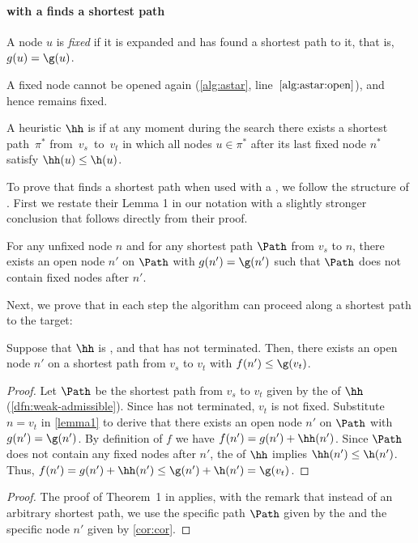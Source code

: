 \paragraph{\A with a \wah finds a shortest path}
\label{sec:weak-admissible-dfn}

\begin{definition}
  A node $u$ is \emph{fixed} if it is expanded and \A has found a shortest path
  to it, that is, $g(u) = \g(u)$.
\end{definition}
A fixed node cannot be opened again (\cref{alg:astar}, line~$\ref{alg:astar:open}$),
and hence remains fixed.

\begin{definition}[\Wa]\label{dfn:weak-admissible}%
  A heuristic $\hh$ is \emph{\wa} if at any moment during the \A search there
  exists a shortest path~$\pi^*$ from~$v_s$~to~$v_t$ in which all nodes $u
  \in \pi^*$ after its last fixed node $n^*$ satisfy $\hh(u) \leq \h(u)$.
\end{definition}

To prove that \A finds a shortest path when used with a \wah, we follow the
structure of \citet{hart1968formal}. First we restate their Lemma 1 in our
notation with a slightly stronger conclusion that follows directly from
their proof.

\begin{lem}\label{lemma1}
  For any unfixed node $n$ and for any shortest path $\Path$ from $v_s$ to $n$,
  there exists an open node $n'$ on $\Path$ with $g(n') = \g(n')$ such that
  $\Path$ does not contain fixed nodes after $n'$.
\end{lem}

Next, we prove that in each step the \A algorithm can proceed along a shortest path
to the target:

\begin{cor}\label{cor:cor}
  Suppose that $\hh$ is \wa, and that \A has not terminated. Then, there exists
  an open node $n'$ on a shortest path from $v_s$ to $v_t$ with $f(n') \leq
  \g(v_t)$.
\end{cor}
\begin{proof}
  Let $\Path$ be the shortest path from $v_s$ to $v_t$ given by the \way of $\hh$ (\cref{dfn:weak-admissible}).
  Since \A has not terminated, $v_t$ is not fixed.
  Substitute ${n=v_t}$ in \cref{lemma1} to derive that
  there exists an open node $n'$ on $\Path$ with $g(n') = \g(n')$. By
  definition of $f$ we have $f(n') = g(n') + \hh(n')$. Since $\Path$ does not
  contain any fixed nodes after $n'$, the \way of $\hh$ implies $\hh(n')
  \leq \h(n')$. Thus, ${f(n') = g(n') + \hh(n') \leq \g(n') + \h(n') = \g(v_t)}$.
\end{proof}

\thmpartialadmissibledfn*
\begin{proof}
  The proof of Theorem~1 in \citet{hart1968formal} applies, with the remark that
  instead of an arbitrary shortest path, we use the specific path $\Path$
  given by the \way and the specific node $n'$ given by \cref{cor:cor}.
\end{proof}
